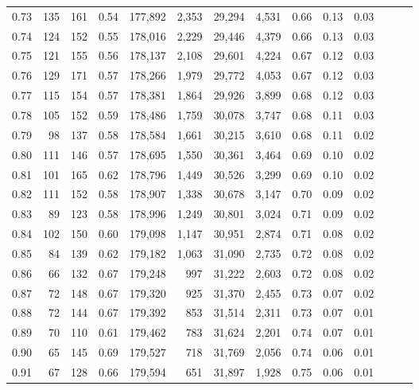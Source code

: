 \begin{tabular}{rrrrrrrrrrrrrr}
0.73 &     135 &  161 &  0.54 &  177,892 &    2,353 &  29,294 &   4,531 &  0.66 &  0.13 &      0.03 \\
0.74 &     124 &  152 &  0.55 &  178,016 &    2,229 &  29,446 &   4,379 &  0.66 &  0.13 &      0.03 \\
0.75 &     121 &  155 &  0.56 &  178,137 &    2,108 &  29,601 &   4,224 &  0.67 &  0.12 &      0.03 \\
0.76 &     129 &  171 &  0.57 &  178,266 &    1,979 &  29,772 &   4,053 &  0.67 &  0.12 &      0.03 \\
0.77 &     115 &  154 &  0.57 &  178,381 &    1,864 &  29,926 &   3,899 &  0.68 &  0.12 &      0.03 \\
0.78 &     105 &  152 &  0.59 &  178,486 &    1,759 &  30,078 &   3,747 &  0.68 &  0.11 &      0.03 \\
0.79 &      98 &  137 &  0.58 &  178,584 &    1,661 &  30,215 &   3,610 &  0.68 &  0.11 &      0.02 \\
0.80 &     111 &  146 &  0.57 &  178,695 &    1,550 &  30,361 &   3,464 &  0.69 &  0.10 &      0.02 \\
0.81 &     101 &  165 &  0.62 &  178,796 &    1,449 &  30,526 &   3,299 &  0.69 &  0.10 &      0.02 \\
0.82 &     111 &  152 &  0.58 &  178,907 &    1,338 &  30,678 &   3,147 &  0.70 &  0.09 &      0.02 \\
0.83 &      89 &  123 &  0.58 &  178,996 &    1,249 &  30,801 &   3,024 &  0.71 &  0.09 &      0.02 \\
0.84 &     102 &  150 &  0.60 &  179,098 &    1,147 &  30,951 &   2,874 &  0.71 &  0.08 &      0.02 \\
0.85 &      84 &  139 &  0.62 &  179,182 &    1,063 &  31,090 &   2,735 &  0.72 &  0.08 &      0.02 \\
0.86 &      66 &  132 &  0.67 &  179,248 &      997 &  31,222 &   2,603 &  0.72 &  0.08 &      0.02 \\
0.87 &      72 &  148 &  0.67 &  179,320 &      925 &  31,370 &   2,455 &  0.73 &  0.07 &      0.02 \\
0.88 &      72 &  144 &  0.67 &  179,392 &      853 &  31,514 &   2,311 &  0.73 &  0.07 &      0.01 \\
0.89 &      70 &  110 &  0.61 &  179,462 &      783 &  31,624 &   2,201 &  0.74 &  0.07 &      0.01 \\
0.90 &      65 &  145 &  0.69 &  179,527 &      718 &  31,769 &   2,056 &  0.74 &  0.06 &      0.01 \\
0.91 &      67 &  128 &  0.66 &  179,594 &      651 &  31,897 &   1,928 &  0.75 &  0.06 &      0.01 \\

\end{tabular}

